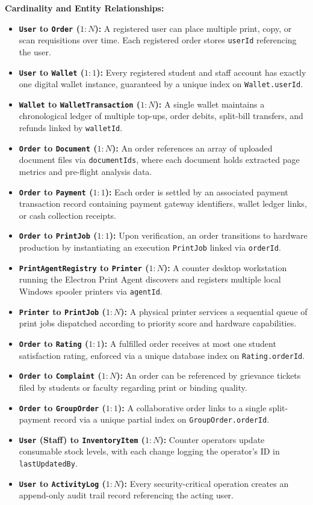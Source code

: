 \documentclass[12pt,a4paper]{report}
\begin{document}
\noindent\textbf{Cardinality and Entity Relationships:}
\begin{itemize}[leftmargin=0.35in, itemsep=2pt]
  \item \textbf{\texttt{User} to \texttt{Order} ($1:N$):} A registered user can place multiple print, copy, or scan requisitions over time. Each registered order stores \texttt{userId} referencing the user.
  \item \textbf{\texttt{User} to \texttt{Wallet} ($1:1$):} Every registered student and staff account has exactly one digital wallet instance, guaranteed by a unique index on \texttt{Wallet.userId}.
  \item \textbf{\texttt{Wallet} to \texttt{WalletTransaction} ($1:N$):} A single wallet maintains a chronological ledger of multiple top-ups, order debits, split-bill transfers, and refunds linked by \texttt{walletId}.
  \item \textbf{\texttt{Order} to \texttt{Document} ($1:N$):} An order references an array of uploaded document files via \texttt{documentIds}, where each document holds extracted page metrics and pre-flight analysis data.
  \item \textbf{\texttt{Order} to \texttt{Payment} ($1:1$):} Each order is settled by an associated payment transaction record containing payment gateway identifiers, wallet ledger links, or cash collection receipts.
  \item \textbf{\texttt{Order} to \texttt{PrintJob} ($1:1$):} Upon verification, an order transitions to hardware production by instantiating an execution \texttt{PrintJob} linked via \texttt{orderId}.
  \item \textbf{\texttt{PrintAgentRegistry} to \texttt{Printer} ($1:N$):} A counter desktop workstation running the Electron Print Agent discovers and registers multiple local Windows spooler printers via \texttt{agentId}.
  \item \textbf{\texttt{Printer} to \texttt{PrintJob} ($1:N$):} A physical printer services a sequential queue of print jobs dispatched according to priority score and hardware capabilities.
  \item \textbf{\texttt{Order} to \texttt{Rating} ($1:1$):} A fulfilled order receives at most one student satisfaction rating, enforced via a unique database index on \texttt{Rating.orderId}.
  \item \textbf{\texttt{Order} to \texttt{Complaint} ($1:N$):} An order can be referenced by grievance tickets filed by students or faculty regarding print or binding quality.
  \item \textbf{\texttt{Order} to \texttt{GroupOrder} ($1:1$):} A collaborative order links to a single split-payment record via a unique partial index on \texttt{GroupOrder.orderId}.
  \item \textbf{\texttt{User} (Staff) to \texttt{InventoryItem} ($1:N$):} Counter operators update consumable stock levels, with each change logging the operator's ID in \texttt{lastUpdatedBy}.
  \item \textbf{\texttt{User} to \texttt{ActivityLog} ($1:N$):} Every security-critical operation creates an append-only audit trail record referencing the acting user.
\end{itemize}
\end{document}

